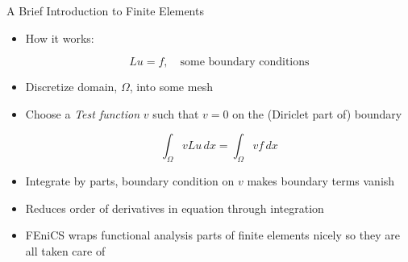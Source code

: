 \documentclass[serif]{beamer}
\begin{document}
\begin{frame}{A Brief Introduction to Finite Elements}
    \begin{itemize}
        \item How it works:
        
        \[
            Lu = f, \quad \text{some boundary conditions}
        \]
        
        \item Discretize domain, $\Omega$, into some mesh
        
        \item Choose a \textit{Test function} $v$ such that $v = 0$ on the (Diriclet part of) boundary
        
        \[
            \int_\Omega v Lu \, dx = \int_\Omega v f \, dx
        \]
        
        \item Integrate by parts, boundary condition on $v$ makes 
        boundary terms vanish
        \item Reduces order of derivatives in equation through integration
        
        \item FEniCS wraps functional analysis parts of finite elements nicely so they are all taken care of
    \end{itemize}
\end{frame}
\end{document}
